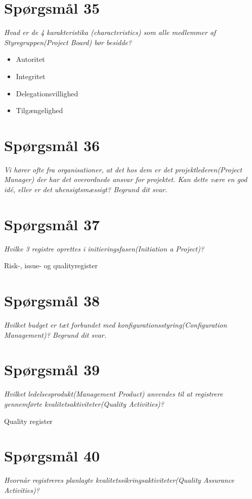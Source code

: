 \section{Spørgsmål 35}
\textit{Hvad er de 4 karakteristika (characteristics) som alle medlemmer af Styregruppen(Project Board) bør besidde?}

\begin{itemize}
    \item Autoritet
    \item Integritet
    \item Delegationsvillighed
    \item Tilgængelighed
\end{itemize}

\section{Spørgsmål 36}
\textit{Vi hører ofte fra organisationer, at det hos dem er det projektlederen(Project Manager) der har det overordnede ansvar for projektet. Kan dette være en god idé, eller er det uhensigtsmæssigt? Begrund dit svar.}

\section{Spørgsmål 37}
\textit{Hvilke 3 registre oprettes i initieringsfasen(Initiation a Project)?}

Risk-, issue- og qualityregister

\section{Spørgsmål 38}
\textit{Hvilket budget er tæt forbundet med konfigurationsstyring(Configuration Management)? Begrund dit svar.}

\section{Spørgsmål 39}
\textit{Hvilket ledelsesprodukt(Management Product) anvendes til at registrere gennemførte kvalitetsaktiviteter(Quality Activities)?}

Quality register

\section{Spørgsmål 40}
\textit{Hvornår registreres planlagte kvalitetssikringsaktiviteter(Quality Assurance Activities)?}

